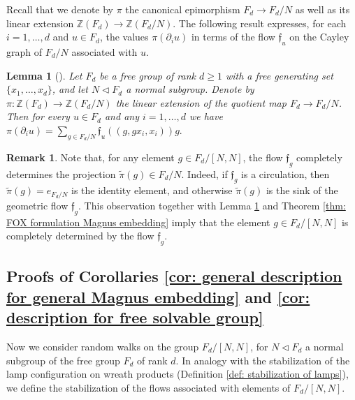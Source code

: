 \documentclass[reqno,oneside,11pt]{amsart}
\newcommand{\Z}{\mathbb{Z}}
\theoremstyle{plain}
\newtheorem{lem}[thm]{Lemma}
\theoremstyle{definition}
\newtheorem{rem}[thm]{Remark}
\begin{document}
Recall that we denote by $\pi$ the canonical epimorphism $F_d\to F_d/N$ as well as its linear extension $\Z(F_d)\to \Z(F_d/N)$. The following result expresses, for each $i=1,\ldots,d$ and $u\in F_d$, the values $\pi(\partial_i u)$ in terms of the flow $\mathfrak{f}_u$ on the Cayley graph of $F_d/N$ associated with $u$.
\begin{lem}[{\cite[Lemma 2.6]{MyasnikovRomankovUshakovVershik2010}}]\label{lem: fox derivatives in terms of flows}  Let $F_d$ be a free group of rank $d\ge 1$ with a free generating set $\{x_1,\ldots,x_d\}$, and let $N\lhd F_d$ a normal subgroup. Denote by $\pi:\Z(F_d)\to \Z(F_d/N)$ the linear extension of the quotient map $F_d\to F_d/N$. Then for every $u\in F_d$ and any $i=1,\ldots,d$ we have
	\(
	\pi(\partial_i u)=\sum_{g\in F_d/N}\mathfrak{f}_u((g,gx_i,x_i))g.
	\)
\end{lem}

\begin{rem}\label{remark: flow completely determines element of FdNN}
	Note that, for any element $g\in F_d/[N,N]$, the flow $\mathfrak{f}_g$ completely determines the projection $\widetilde{\pi}(g)\in F_d/N.$ Indeed, if $\mathfrak{f}_g$ is a circulation, then $\widetilde{\pi}(g)=e_{F_d/N}$ is the identity element, and otherwise $\widetilde{\pi}(g)$ is the sink of the geometric flow $\mathfrak{f}_g$. This observation together with Lemma \ref{lem: fox derivatives in terms of flows} and Theorem \ref{thm: FOX formulation Magnus embedding} imply that the element $g\in F_d/[N,N]$ is completely determined by the flow $\mathfrak{f}_g$.
\end{rem}



\subsection{Proofs of Corollaries \ref{cor: general description for general Magnus embedding} and \ref{cor: description for free solvable group}}

Now we consider random walks on the group $F_d/[N,N]$, for $N\lhd F_d$ a normal subgroup of the free group $F_d$ of rank $d$. In analogy with the stabilization of the lamp configuration on wreath products (Definition \ref{def: stabilization of lamps}), we define the stabilization of the flows associated with elements of $F_d/[N,N]$.
\end{document}
